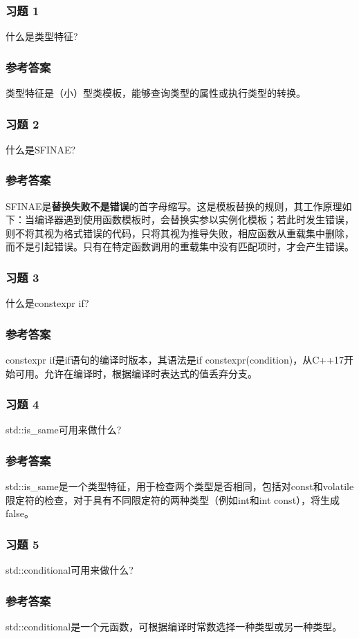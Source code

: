 \subsubsection{习题 1}

什么是类型特征?

\subsubsection{参考答案}

类型特征是（小）型类模板，能够查询类型的属性或执行类型的转换。


\subsubsection{习题 2}

什么是SFINAE?

\subsubsection{参考答案}

SFINAE是\textbf{替换失败不是错误}的首字母缩写。这是模板替换的规则，其工作原理如下：当编译器遇到使用函数模板时，会替换实参以实例化模板；若此时发生错误，则不将其视为格式错误的代码，只将其视为推导失败，相应函数从重载集中删除，而不是引起错误。只有在特定函数调用的重载集中没有匹配项时，才会产生错误。

\subsubsection{习题 3}

什么是constexpr if?

\subsubsection{参考答案}

constexpr if是if语句的编译时版本，其语法是if constexpr(condition)，从C++17开始可用。允许在编译时，根据编译时表达式的值丢弃分支。

\subsubsection{习题 4}

std::is\_same可用来做什么?

\subsubsection{参考答案}

std::is\_same是一个类型特征，用于检查两个类型是否相同，包括对const和volatile限定符的检查，对于具有不同限定符的两种类型（例如int和int const），将生成false。

\subsubsection{习题 5}

std::conditional可用来做什么?

\subsubsection{参考答案}

std::conditional是一个元函数，可根据编译时常数选择一种类型或另一种类型。












